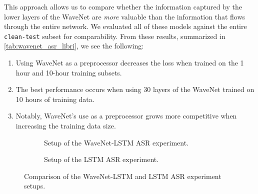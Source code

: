 This approach allows us to compare whether the information captured by the lower layers of the WaveNet are \textit{more} valuable than the information that flows through the entire network. 
We evaluated all of these models against the entire \texttt{clean-test} subset for comparability.
From these results, summarized in \cref{tab:wavenet_asr_libri}, we see the following:
\begin{enumerate}
    \item Using WaveNet as a preprocessor decreases the loss when trained on the 1 hour and 10-hour training subsets. 
    \item The best performance occurs when using 30 layers of the WaveNet trained on 10 hours of training data.
    \item Notably, WaveNet's use as a preprocessor grows more competitive when increasing the training data size. 
\end{enumerate}


\begin{figure}
    \centering
    \begin{subfigure}[b]{0.5\linewidth}
        \resizebox{\columnwidth}{!}{
            
        }
    \caption{Setup of the WaveNet-LSTM ASR experiment.}
    \label{fig:wavenet-asr}
    \end{subfigure}%
    \begin{subfigure}[b]{0.5\linewidth}
        \resizebox{\columnwidth}{!}{
            
        }
    \caption{Setup of the LSTM ASR experiment.}
    \label{fig:lstm-asr}
    \end{subfigure}
    \caption{
    Comparison of the WaveNet-LSTM and LSTM ASR experiment setups.
    }
\end{figure}



